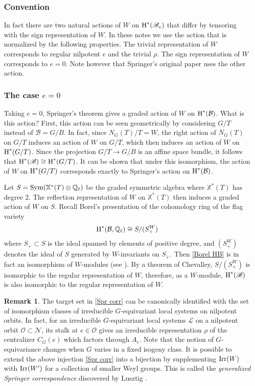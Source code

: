 \documentclass[]{pcmi}
\let\oldsubsubsection\subsubsection
\renewcommand{\subsubsection}[1]{%
\setcounter{subsubsection}{\value{equation}}%
\oldsubsubsection{#1}%
\refstepcounter{equation}%
}
\theoremstyle{plain}
\theoremstyle{definition}
\newtheorem{remark}[equation]{Remark}
\def\QQ{\mathbb{Q}}
\def\calB{\mathcal{B}}
\def\calL{\mathcal{L}}
\def\calO{\mathcal{O}}
\newcommand{\sB}{\ensuremath{\mathscr{B}}\xspace}
\newcommand{\sN}{\ensuremath{\mathscr{N}}\xspace}
\newcommand{\sB}{\ensuremath{\mathcal{B}}\xspace}
\newcommand{\sN}{\ensuremath{\mathcal{N}}\xspace}
\newcommand\Irr{\textup{Irr}}
\newcommand\Sym{\textup{Sym}}
\newcommand\xch{\mathbb{X}^*}
\newcommand{\Ql}{\QQ_{\ell}}
\newcommand{\cohog}[2]{\textup{H}^{#1}({#2})}     %
\begin{document}
\subsubsection{Convention}\label{sss:two actions} In fact there are two natural actions of $W$ on $\cohog{*}{\sB_{e}}$ that differ by tensoring with the sign representation of $W$. In these notes we use the action that is normalized by the following properties. The trivial representation of $W$ corresponds to regular nilpotent $e$ and the trivial $\rho$. The sign representation of $W$ corresponds to $e=0$. Note however that Springer's original paper \cite{Springer} uses the other action.

\subsubsection{The case $e=0$} Taking $e=0$, Springer's theorem gives a graded action of $W$ on $\cohog{*}{\calB}$. What is this action? First, this action can be seen geometrically by considering $G/T$ instead of $\sB=G/B$. In fact, since $N_{G}(T)/T=W$, the right action of $N_{G}(T)$ on $G/T$ induces an action of $W$ on $G/T$, which then induces an action of $W$ on $\cohog{*}{G/T}$. Since the projection $G/T\to G/B$ is an affine space bundle, it follows that $\cohog{*}{\sB}\cong\cohog{*}{G/T}$. It can be shown that under this isomorphism, the action of $W$ on $\cohog{*}{G/T}$ corresponds exactly to Springer's action on $\cohog{*}{\calB}$.

Let $S=\Sym(\xch(T)\otimes\Ql)$ be the graded symmetric algebra where $\xch(T)$ has degree $2$. The reflection representation of $W$ on $\xch(T)$ then induces a graded action of $W$ on $S$. Recall Borel's presentation of the cohomology ring of the flag variety
\begin{equation}\label{Borel HB}
\cohog{*}{\calB,\Ql}\cong S/(S^{W}_{+})
\end{equation}
where $S_{+}\subset S$ is the ideal spanned by elements of positive degree, and $(S^{W}_{+})$ denotes the ideal of $S$ generated by $W$-invariants on $S_{+}$. Then \eqref{Borel HB} is in fact an isomorphism of $W$-modules (see \cite[Prop 7.2]{Springer}). By a theorem of Chevalley, $S/(S^{W}_{+})$ is isomorphic to the regular representation of $W$, therefore, as a $W$-module, $\cohog{*}{\sB}$ is also isomorphic to the regular representation of $W$.  

\begin{remark} The target set in \eqref{Spr corr} can be canonically identified with the set of isomorphism classes of irreducible $G$-equivariant local systems on nilpotent orbits. In fact, for an irreducible $G$-equivariant local systems $\calL$ on a nilpotent orbit $\calO\subset\sN$, its stalk at $e\in\calO$ gives an irreducible representation $\rho$ of the centralizer $C_{G}(e)$ which factors through $A_{e}$. Note that the notion of $G$-equivariance changes when $G$ varies in a fixed isogeny class.  It is possible to extend the above injection \eqref{Spr corr} into a bijection by supplementing $\Irr(W)$ with $\Irr(W')$ for a collection of smaller Weyl groups. This is called the {\em generalized Springer correspondence} discovered by Lusztig \cite{LuIC}.
\end{remark}
\end{document}
